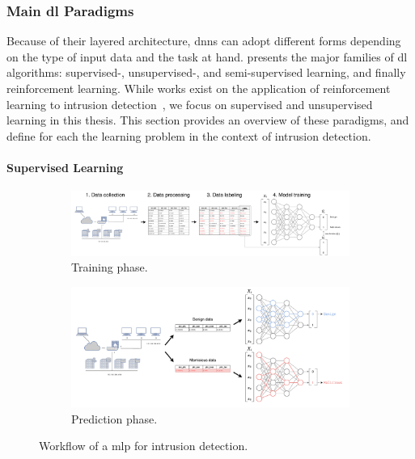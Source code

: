 \subsubsection{Main \Gls{dl} Paradigms}

Because of their layered architecture, \glspl{dnn} can adopt different forms depending on the type of input data and the task at hand.
 presents the major families of \gls{dl} algorithms: supervised-, unsupervised-, and semi-supervised learning, and finally reinforcement learning.
While works exist on the application of reinforcement learning to intrusion detection~\needref{}, we focus on supervised and unsupervised learning in this thesis.
This section provides an overview of these paradigms, and define for each the learning problem in the context of intrusion detection.

\paragraph{Supervised Learning}

\begin{figure}
  \captionsetup{justification=justified,singlelinecheck=false}
  \centering
  \begin{subfigure}{\textwidth}
    \includegraphics[width=\textwidth]{figures/mlp-train.drawio.pdf}
    \caption{
      Training phase.
      \label{fig:bg.mlp.train}
    }
  \end{subfigure}
  \begin{subfigure}{\textwidth}
    \includegraphics[width=.75\textwidth,left]{figures/mlp-predict.drawio.pdf}
    \caption{
      Prediction phase.
      \label{fig:bg.mlp.predict}
    }
  \end{subfigure}
  \caption{
    Workflow of a \acrfull{mlp} for intrusion detection.
    \label{fig:bg.mlp}
  }
\end{figure}

